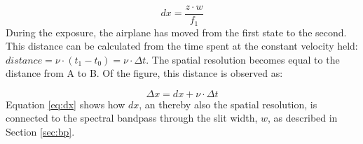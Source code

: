 \begin{equation}
    dx = \frac{z \cdot w}{f_1}
    \label{eq:dx}
\end{equation}
During the exposure, the airplane has moved from the first state to the second. This distance can be calculated from the time spent at the constant velocity held: $distance = \nu \cdot (t_1 - t_0) = \nu \cdot \Delta t$. The spatial resolution becomes equal to the distance from A to B. Of the figure, this distance is observed as: 

\begin{equation}
    \Delta x = dx + \nu \cdot \Delta t
    \label{eq:spares}
\end{equation}
\noindent
Equation \ref{eq:dx} shows how $dx$, an thereby also the spatial resolution, is connected to the spectral bandpass through the slit width, $w$, as described in Section \ref{sec:bp}. 





